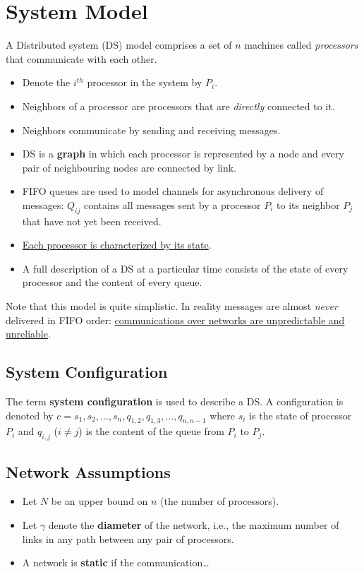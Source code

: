 \section{System Model}
A Distributed system (DS) model comprises a set of $n$ machines called \textit{processors} that communicate with each other.
\begin{itemize}
   \item Denote the $i^{th}$ processor in the system by $P_i$.
   \item Neighbors of a processor are processors that are \textit{directly} connected to it.
   \item Neighbors communicate by sending and receiving messages.
   \item DS is a \textbf{graph} in which each processor is represented by a node and every pair of neighbouring nodes are connected by link.
   \item FIFO queues are used to model channels for asynchronous delivery of messages: $Q_{ij}$ contains all messages sent by a processor $P_i$ to its neighbor $P_j$ that have not yet been received.
   \item \ul{Each processor is characterized by its state}.
   \item A full description of a DS at a particular time consists of the state of every processor and the content of every queue.
\end{itemize}
Note that this model is quite simplistic. In reality messages are almost \textit{never} delivered in FIFO order: \ul{communications over networks are unpredictable and unreliable}.

\subsection{System Configuration}
The term \textbf{system configuration} is used to describe a DS.
A configuration is denoted by $c = {s_1,s_2,\ldots,s_n,q_{1,2},q_{1,3},\ldots,q_{n,n-1}}$ where $s_i$ is the state of processor $P_i$ and $q_{i,j}$ ($i \neq j$) is the content of the queue from $P_i$ to $P_j$.

\subsection{Network Assumptions}
\begin{itemize}
   \item Let $N$ be an upper bound on $n$ (the number of processors).
   \item Let $\gamma$ denote the \textbf{diameter} of the network, i.e., the maximum number of links in any path between any pair of processors.
   \item A network is \textbf{static} if the communication\dots
\end{itemize}

